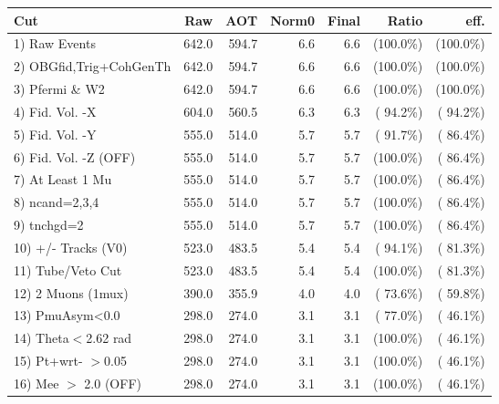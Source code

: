 \begin{table}[h!]\centering
 \begin{tabular}{||l||r|r|r|r|r|r||}
 \hline
 \hline
 Cut & Raw & AOT & Norm0 & Final & Ratio & eff.       \\
 \hline
  1) Raw Events           &        642.0 &        594.7 &          6.6 &          6.6 & (100.0\%) & (100.0\%) \\
  2) OBGfid,Trig+CohGenTh &        642.0 &        594.7 &          6.6 &          6.6 & (100.0\%) & (100.0\%) \\
  3) Pfermi \& W2         &        642.0 &        594.7 &          6.6 &          6.6 & (100.0\%) & (100.0\%) \\
  4) Fid. Vol. -X         &        604.0 &        560.5 &          6.3 &          6.3 & ( 94.2\%) & ( 94.2\%) \\
  5) Fid. Vol. -Y         &        555.0 &        514.0 &          5.7 &          5.7 & ( 91.7\%) & ( 86.4\%) \\
  6) Fid. Vol. -Z (OFF)   &        555.0 &        514.0 &          5.7 &          5.7 & (100.0\%) & ( 86.4\%) \\
  7) At Least 1 Mu        &        555.0 &        514.0 &          5.7 &          5.7 & (100.0\%) & ( 86.4\%) \\
  8) ncand=2,3,4          &        555.0 &        514.0 &          5.7 &          5.7 & (100.0\%) & ( 86.4\%) \\
  9) tnchgd=2             &        555.0 &        514.0 &          5.7 &          5.7 & (100.0\%) & ( 86.4\%) \\
 10) +/- Tracks (V0)      &        523.0 &        483.5 &          5.4 &          5.4 & ( 94.1\%) & ( 81.3\%) \\
 11) Tube/Veto Cut        &        523.0 &        483.5 &          5.4 &          5.4 & (100.0\%) & ( 81.3\%) \\
 12) 2 Muons (1mux)       &        390.0 &        355.9 &          4.0 &          4.0 & ( 73.6\%) & ( 59.8\%) \\
 13) PmuAsym<0.0          &        298.0 &        274.0 &          3.1 &          3.1 & ( 77.0\%) & ( 46.1\%) \\
 14) Theta$<$2.62 rad     &        298.0 &        274.0 &          3.1 &          3.1 & (100.0\%) & ( 46.1\%) \\
 15) Pt+wrt- $>$0.05      &        298.0 &        274.0 &          3.1 &          3.1 & (100.0\%) & ( 46.1\%) \\
 16) Mee $>$ 2.0  (OFF)   &        298.0 &        274.0 &          3.1 &          3.1 & (100.0\%) & ( 46.1\%) \\

\end{tabular}
\end{table}
